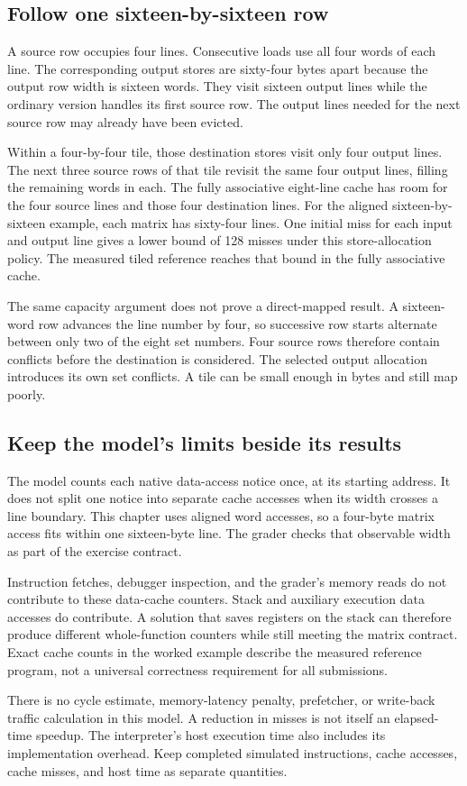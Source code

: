\subsection{Follow one sixteen-by-sixteen row}
A source row occupies four lines. Consecutive loads use all four words of each
line. The corresponding output stores are sixty-four bytes apart because the
output row width is sixteen words. They visit sixteen output lines while the
ordinary version handles its first source row. The output lines needed for the
next source row may already have been evicted.

Within a four-by-four tile, those destination stores visit only four output
lines. The next three source rows of that tile revisit the same four output
lines, filling the remaining words in each. The fully associative eight-line
cache has room for the four source lines and those four destination lines.
For the aligned sixteen-by-sixteen example, each matrix has sixty-four lines.
One initial miss for each input and output line gives a lower bound of 128
misses under this store-allocation policy. The measured tiled reference reaches
that bound in the fully associative cache.

The same capacity argument does not prove a direct-mapped result. A sixteen-word
row advances the line number by four, so successive row starts alternate between
only two of the eight set numbers. Four source rows therefore contain conflicts
before the destination is considered. The selected output allocation introduces
its own set conflicts. A tile can be small enough in bytes and still map poorly.

\subsection{Keep the model's limits beside its results}
The model counts each native data-access notice once, at its starting address.
It does not split one notice into separate cache accesses when its width crosses
a line boundary. This chapter uses aligned word accesses, so a four-byte matrix
access fits within one sixteen-byte line. The grader checks that observable
width as part of the exercise contract.

Instruction fetches, debugger inspection, and the grader's memory reads do not
contribute to these data-cache counters. Stack and auxiliary execution data
accesses do contribute. A solution that saves registers on the stack can
therefore produce different whole-function counters while still meeting the
matrix contract. Exact cache counts in the worked example describe the measured
reference program, not a universal correctness requirement for all submissions.

There is no cycle estimate, memory-latency penalty, prefetcher, or write-back
traffic calculation in this model. A reduction in misses is not itself an
elapsed-time speedup. The interpreter's host execution time also includes its
implementation overhead. Keep completed simulated instructions, cache accesses,
cache misses, and host time as separate quantities.
